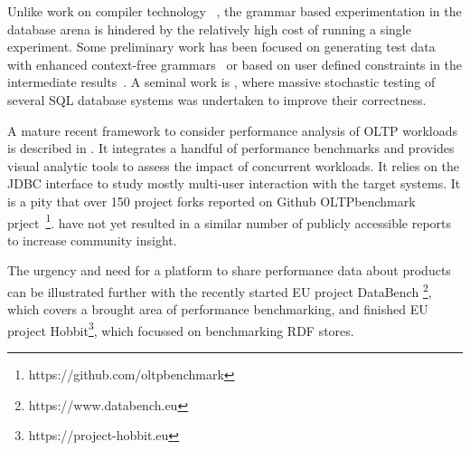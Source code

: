 \documentclass{cidr-2019}
\begin{document}
Unlike work on compiler technology
~\cite{McKeeman98differentialtesting}, the grammar based
experimentation in the database arena is hindered by the relatively
high cost of running a single experiment. Some preliminary work has
been focused on generating test data with enhanced context-free
grammars~\cite{10.1007/978-3-319-11245-9_19} or based on user defined
constraints in the intermediate
results~\cite{Binnig:2007:QGQ:1247480.1247520}. A seminal work is
\cite{DBLP:conf/vldb/Slutz98}, where massive stochastic testing of
several SQL database systems was undertaken to improve their
correctness.

A mature recent framework to consider performance analysis of OLTP
workloads is described in \cite{DBLP:journals/pvldb/DifallahPCC13}. It
integrates a handful of performance benchmarks and provides visual
analytic tools to assess the impact of concurrent workloads. It
relies on the JDBC interface to study mostly multi-user interaction
with the target systems. It is a pity that over 150 project forks
reported on Github OLTPbenchmark prject~\footnote{https://github.com/oltpbenchmark}.
have not yet resulted in a similar number of publicly accessible
reports to increase community insight.

The urgency and need for a platform to share performance data about
products can be illustrated further with the recently started EU project DataBench \footnote{https://www.databench.eu},
which covers a brought area of performance benchmarking,
and finished EU project Hobbit\footnote{ https://project-hobbit.eu}, which focussed on benchmarking RDF stores.  

\end{document}

